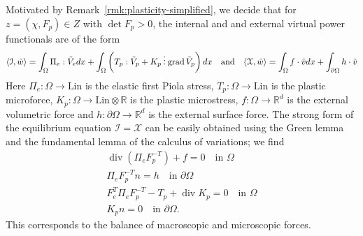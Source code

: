 \documentclass[a4paper,10pt,oneside]{amsbook}
\numberwithin{section}{chapter}
\numberwithin{equation}{chapter}
\theoremstyle{definition}
\DeclareMathOperator{\diver}{div}
\DeclareMathOperator{\grad}{grad}
\DeclarePairedDelimiter{\dual}{\langle}{\rangle}
\newcommand{\threedots}{\mathbin{\vdots}}
\begin{document}
Motivated by Remark~\ref{rmk:plasticity-simplified}, we decide that for $z=(\chi,F_p)\in Z$ with $\det F_p>0$, the internal and and external virtual power functionals are of the form
\begin{equation}
\label{eqn:ppv-large-plasticity}
\dual{\mathcal{I},\tilde w}=\int_\Omega \Pi_e:\tilde V_edx+\int_\Omega\left(T_p:\tilde V_p+K_p\threedots\grad\tilde V_p\right)dx
\quad\text{and}\quad
\dual{\mathcal{X},\tilde w}=\int_\Omega f\cdot\tilde vdx+\int_{\partial\Omega}h\cdot\tilde v
\end{equation}
Here $\Pi_e\colon\Omega\to\text{Lin}$ is the elastic first Piola stress, $T_p\colon\Omega\to\text{Lin}$ is the plastic microforce, $K_p\colon\Omega\to\text{Lin}\otimes\mathbb{R}$ is the plastic microstress, $f\colon\Omega\to\mathbb{R}^d$ is the external volumetric force and $h\colon\partial\Omega\to\mathbb{R}^d$ is the external surface force. The strong form of the equilibrium equation $\mathcal{I}=\mathcal{X}$ can be easily obtained using the Green lemma and the fundamental lemma of the calculus of variations; we find
\begin{gather*}
\diver(\Pi_eF_p^{-T})+f=0\quad\text{in $\Omega$} \\
\Pi_eF_p^{-T}n=h\quad\text{in $\partial\Omega$} \\
F_e^T\Pi_eF_p^{-T}-T_p+\diver K_p=0\quad\text{in $\Omega$} \\
K_pn=0\quad\text{in $\partial\Omega$}.
\end{gather*}
This corresponds to the balance of macroscopic and microscopic forces.
\end{document}
